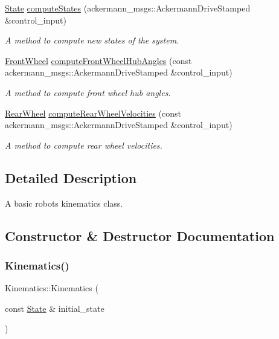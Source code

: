 \begin{DoxyCompactItemize}
\hyperlink{structState}{State} \hyperlink{classKinematics_abc359954c01ed158fe090e01b5539f06}{compute\+States} (ackermann\+\_\+msgs\+::\+Ackermann\+Drive\+Stamped \&control\+\_\+input)
\begin{DoxyCompactList}\small\item\em A method to compute new states of the system. \end{DoxyCompactList}\item 
\hyperlink{structFrontWheel}{Front\+Wheel} \hyperlink{classKinematics_af5e5528ca44f82edae99025410595a36}{compute\+Front\+Wheel\+Hub\+Angles} (const ackermann\+\_\+msgs\+::\+Ackermann\+Drive\+Stamped \&control\+\_\+input)
\begin{DoxyCompactList}\small\item\em A method to compute front wheel hub angles. \end{DoxyCompactList}\item 
\hyperlink{structRearWheel}{Rear\+Wheel} \hyperlink{classKinematics_ac2733720e49bcd20662e74ea9334a878}{compute\+Rear\+Wheel\+Velocities} (const ackermann\+\_\+msgs\+::\+Ackermann\+Drive\+Stamped \&control\+\_\+input)
\begin{DoxyCompactList}\small\item\em A method to compute rear wheel velocities. \end{DoxyCompactList}\end{DoxyCompactItemize}


\subsection{Detailed Description}
A basic robot\textquotesingle{}s kinematics class. 

\subsection{Constructor \& Destructor Documentation}
\mbox{\label{classKinematics_adb48748237fe9076e7d8aac5b435e95f}} 
\subsubsection{\texorpdfstring{Kinematics()}{Kinematics()}}
{\footnotesize\ttfamily Kinematics\+::\+Kinematics (\begin{DoxyParamCaption}\item[{const \hyperlink{structState}{State} \&}]{initial\+\_\+state }\end{DoxyParamCaption})}



